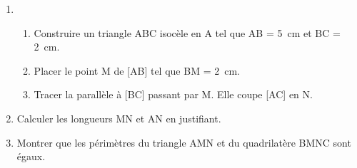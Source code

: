 
\medskip 

\begin{enumerate}
\item 
	\begin{enumerate}
		\item Construire un triangle ABC isocèle en A tel que AB = 5~cm et BC = 2~cm. 
		\item Placer le point M de [AB] tel que BM = 2~cm. 
		\item Tracer la parallèle à [BC] passant par M. Elle coupe [AC] en N. 
	\end{enumerate}
\item Calculer les longueurs MN et AN en justifiant. 
\item Montrer que les périmètres du triangle AMN et du quadrilatère BMNC sont égaux. 
\end{enumerate}

\vspace{0,5cm}

